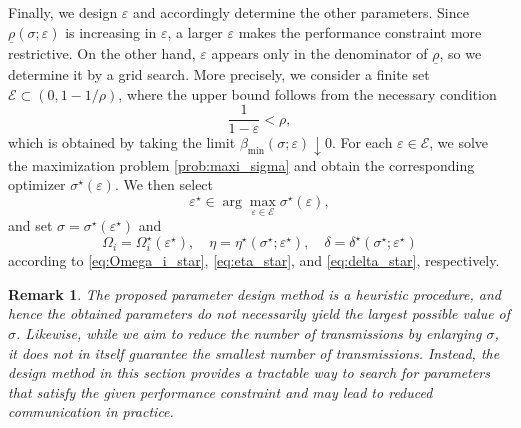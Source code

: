 \documentclass[letterpaper,10pt,conference]{ieeeconf}
\newtheorem{remark}{Remark}
\begin{document}
Finally, we design $\varepsilon$ and accordingly determine the other parameters.
Since $\underline\rho(\sigma; \varepsilon)$ is increasing in $\varepsilon$, a larger $\varepsilon$ makes the performance constraint more restrictive.
On the other hand, $\varepsilon$ appears only in the denominator of $\underline\rho$, so we determine it by a grid search.
More precisely, we consider a finite set $\mathcal E \subset (0, 1 - 1/\rho)$, where the upper bound follows from the necessary condition
\begin{equation}
  \frac{1}{1-\varepsilon} < \rho,
\end{equation}
which is obtained by taking the limit $\beta_{\min}(\sigma; \varepsilon) \downarrow 0$.
For each $\varepsilon \in \mathcal E$, we solve the maximization problem \eqref{prob:maxi_sigma} and obtain the corresponding optimizer $\sigma^\star(\varepsilon)$.
We then select
\begin{equation}
  \varepsilon^\star
  \in
  \arg\max_{\varepsilon \in \mathcal E}
  \sigma^\star(\varepsilon),
\end{equation}
and set $\sigma = \sigma^\star(\varepsilon^\star)$ and
\begin{equation}
  \Omega_i = \Omega_i^\star(\varepsilon^\star),\quad
  \eta = \eta^\star(\sigma^\star; \varepsilon^\star),\quad
  \delta = \delta^\star(\sigma^\star; \varepsilon^\star)
\end{equation}
according to \eqref{eq:Omega_i_star}, \eqref{eq:eta_star}, and \eqref{eq:delta_star}, respectively.

\begin{remark}
  The proposed parameter design method is a heuristic procedure, and hence the obtained parameters do not necessarily yield the largest possible value of $\sigma$.
  Likewise, while we aim to reduce the number of transmissions by enlarging $\sigma$, it does not in itself guarantee the smallest number of transmissions.
  Instead, the design method in this section provides a tractable way to search for parameters that satisfy the given performance constraint and may lead to reduced communication in practice.
\end{remark}
\end{document}
